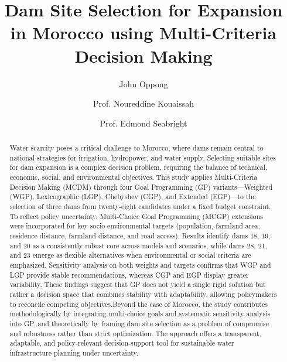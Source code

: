 \begin{frontmatter}

    \title{Dam Site Selection for Expansion in Morocco using Multi-Criteria Decision Making}

    \author[opj]{John Oppong}
    \author[abs-supervisor]{Prof. Noureddine Kouaissah}
    \author[sci-supervisor]{Prof. Edmond Seabright}



\begin{abstract}
Water scarcity poses a critical challenge to Morocco, where dams remain central to national strategies for irrigation, hydropower, and water supply. Selecting suitable sites for dam expansion is a complex decision problem, requiring the balance of technical, economic, social, and environmental objectives. This study applies Multi-Criteria Decision Making (MCDM) through four Goal Programming (GP) variants—Weighted (WGP), Lexicographic (LGP), Chebyshev (CGP), and Extended (EGP)—to the selection of three dams from twenty-eight candidates under a fixed budget constraint. To reflect policy uncertainty, Multi-Choice Goal Programming (MCGP) extensions were incorporated for key socio-environmental targets (population, farmland area, residence distance, farmland distance, and road access). Results identify dams 18, 19, and 20 as a consistently robust core across models and scenarios, while dams 28, 21, and 23 emerge as flexible alternatives when environmental or social criteria are emphasized. Sensitivity analysis on both weights and targets confirms that WGP and LGP provide stable recommendations, whereas CGP and EGP display greater variability. These findings suggest that GP does not yield a single rigid solution but rather a decision space that combines stability with adaptability, allowing policymakers to reconcile competing objectives.Beyond the case of Morocco, the study contributes methodologically by integrating multi-choice goals and systematic sensitivity analysis into GP, and theoretically by framing dam site selection as a problem of compromise and robustness rather than strict optimization. The approach offers a transparent, adaptable, and policy-relevant decision-support tool for sustainable water infrastructure planning under uncertainty.
\end{abstract}



\end{frontmatter}
